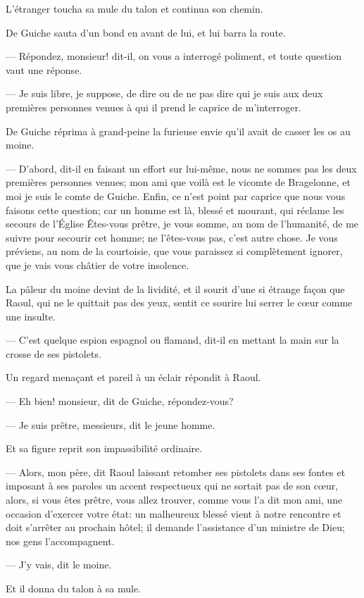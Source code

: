 L'étranger toucha sa mule du talon et continua son chemin.

De Guiche sauta d'un bond en avant de lui, et lui barra la route.

— Répondez, monsieur! dit-il, on vous a interrogé poliment, et toute question vaut une réponse.

— Je suis libre, je suppose, de dire ou de ne pas dire qui je suis aux deux premières personnes venues à qui il prend le caprice de m'interroger.

De Guiche réprima à grand-peine la furieuse envie qu'il avait de casser les os au moine.

— D'abord, dit-il en faisant un effort sur lui-même, nous ne sommes pas les deux premières personnes venues; mon ami que voilà est le vicomte de Bragelonne, et moi je suis le comte de Guiche. Enfin, ce n'est point par caprice que nous vous faisons cette question; car un homme est là, blessé et mourant, qui réclame les secours de l'Église Êtes-vous prêtre, je vous somme, au nom de l'humanité, de me suivre pour secourir cet homme; ne l'êtes-vous pas, c'est autre chose. Je vous préviens, au nom de la courtoisie, que vous paraissez si complètement ignorer, que je vais vous châtier de votre insolence.

La pâleur du moine devint de la lividité, et il sourit d'une si étrange façon que Raoul, qui ne le quittait pas des yeux, sentit ce sourire lui serrer le cœur comme une insulte.

— C'est quelque espion espagnol ou flamand, dit-il en mettant la main sur la crosse de ses pistolets.

Un regard menaçant et pareil à un éclair répondit à Raoul.

— Eh bien! monsieur, dit de Guiche, répondez-vous?

— Je suis prêtre, messieurs, dit le jeune homme.

Et sa figure reprit son impassibilité ordinaire.

— Alors, mon père, dit Raoul laissant retomber ses pistolets dans ses fontes et imposant à ses paroles un accent respectueux qui ne sortait pas de son cœur, alors, si vous êtes prêtre, vous allez trouver, comme vous l'a dit mon ami, une occasion d'exercer votre état: un malheureux blessé vient à notre rencontre et doit s'arrêter au prochain hôtel; il demande l'assistance d'un ministre de Dieu; nos gens l'accompagnent.

— J'y vais, dit le moine.

Et il donna du talon à sa mule.

